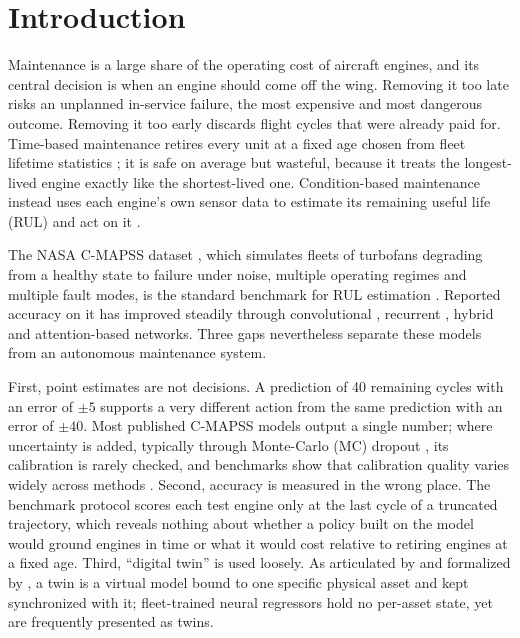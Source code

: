 \documentclass[preprint,12pt,authoryear]{elsarticle}
\begin{document}
\linenumbers

\section{Introduction}\label{sec:intro}

Maintenance is a large share of the operating cost of aircraft engines, and its central decision is when an engine should come off the wing. Removing it too late risks an unplanned in-service failure, the most expensive and most dangerous outcome. Removing it too early discards flight cycles that were already paid for. Time-based maintenance retires every unit at a fixed age chosen from fleet lifetime statistics \citep{barlow1960optimum}; it is safe on average but wasteful, because it treats the longest-lived engine exactly like the shortest-lived one. Condition-based maintenance instead uses each engine's own sensor data to estimate its remaining useful life (RUL) and act on it \citep{jardine2006review,lei2018review}.

The NASA C-MAPSS dataset \citep{saxena2008damage}, which simulates fleets of turbofans degrading from a healthy state to failure under noise, multiple operating regimes and multiple fault modes, is the standard benchmark for RUL estimation \citep{ramasso2014benchmark}. Reported accuracy on it has improved steadily through convolutional \citep{babu2016cnn,li2018dcnn}, recurrent \citep{zheng2017lstm}, hybrid \citep{aldulaimi2019hdnn} and attention-based \citep{ragab2020ats2s} networks. Three gaps nevertheless separate these models from an autonomous maintenance system.

First, point estimates are not decisions. A prediction of 40 remaining cycles with an error of $\pm5$ supports a very different action from the same prediction with an error of $\pm40$. Most published C-MAPSS models output a single number; where uncertainty is added, typically through Monte-Carlo (MC) dropout \citep{gal2016dropout}, its calibration is rarely checked, and benchmarks show that calibration quality varies widely across methods \citep{basora2023uqbench}. Second, accuracy is measured in the wrong place. The benchmark protocol scores each test engine only at the last cycle of a truncated trajectory, which reveals nothing about whether a policy built on the model would ground engines in time or what it would cost relative to retiring engines at a fixed age. Third, ``digital twin'' is used loosely. As articulated by \citet{glaessgen2012digital} and formalized by \citet{grieves2017digital}, a twin is a virtual model bound to one specific physical asset and kept synchronized with it; fleet-trained neural regressors hold no per-asset state, yet are frequently presented as twins.
\end{document}
